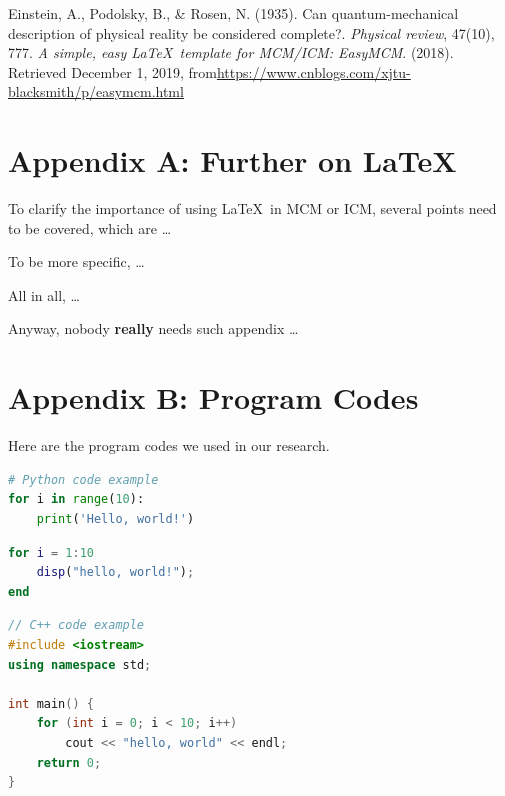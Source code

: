 \documentclass[12pt]{article}  %
\begin{document}
\begin{thebibliography}{99}
 Einstein, A., Podolsky, B., \& Rosen, N. (1935). Can quantum-mechanical description of physical reality be considered complete?. \emph{Physical review}, 47(10), 777.
 \emph{A simple, easy \LaTeX\ template for MCM/ICM: EasyMCM}. (2018). Retrieved December 1, 2019, from\url{https://www.cnblogs.com/xjtu-blacksmith/p/easymcm.html}
\end{thebibliography}


\begin{subappendices}  %

\section{Appendix A: Further on \LaTeX}
To clarify the importance of using \LaTeX\ in MCM or ICM, several points need to be covered, which are \ldots

To be more specific, \ldots

All in all, \ldots

Anyway, nobody \textbf{really} needs such appendix \ldots

\section{Appendix B: Program Codes}
Here are the program codes we used in our research.


\begin{lstlisting}[language=Python, name={test.py}]
# Python code example
for i in range(10):
    print('Hello, world!')
\end{lstlisting}

\begin{lstlisting}[language=MATLAB, name={test.m}]
% MATLAB code example
for i = 1:10
    disp("hello, world!");
end
\end{lstlisting}



\begin{lstlisting}[language=C++, name={test.cpp}]
// C++ code example
#include <iostream>
using namespace std;

int main() {
    for (int i = 0; i < 10; i++)
        cout << "hello, world" << endl;
    return 0;
}
\end{lstlisting}

\end{subappendices}  %
\end{document}
